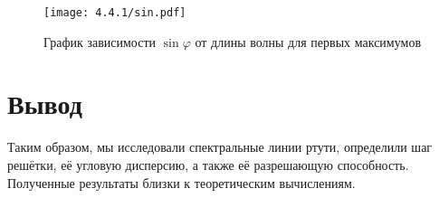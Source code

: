 \documentclass[a4paper, 12pt]{article}
\begin{document}
\begin{figure}[H]
    \centering
    \texttt{[image: 4.4.1/sin.pdf]}
    \caption{График зависимости $\sin \varphi$ от длины волны для первых максимумов}
    \label{angle}
\end{figure}


\section{Вывод}

Таким образом, мы исследовали спектральные линии ртути, определили шаг решётки, её угловую дисперсию, а также её разрешающую способность. Полученные результаты близки к теоретическим вычислениям.
\end{document}
